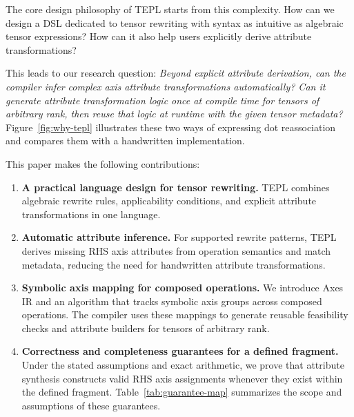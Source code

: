 The core design philosophy of TEPL starts from this complexity.
How can we design a DSL dedicated to tensor rewriting with syntax as
intuitive as algebraic tensor expressions? How can it also help users
explicitly derive attribute transformations?

This leads to our research question: \emph{Beyond explicit attribute
derivation, can the compiler infer complex axis attribute transformations
automatically? Can it generate attribute transformation logic once at
compile time for tensors of arbitrary rank, then reuse that logic at
runtime with the given tensor metadata?}
Figure~\ref{fig:why-tepl} illustrates these two ways of expressing dot
reassociation and compares them with a handwritten implementation.

This paper makes the following contributions:
\begingroup
\setlength{\leftmargini}{2em}
\makeatletter
\let\contributionlistdefaults\@listi
\def\@listi{\contributionlistdefaults
  \topsep2pt\relax
  \itemsep2pt\relax
  \parsep0pt\relax
  \partopsep0pt\relax}
\makeatother
\begin{enumerate}
\item \textbf{A practical language design for tensor rewriting.}
TEPL combines algebraic rewrite rules, applicability conditions, and
explicit attribute transformations in one language.
\item \textbf{Automatic attribute inference.}
For supported rewrite patterns, TEPL derives missing RHS axis attributes
from operation semantics and match metadata, reducing the need for
handwritten attribute transformations.
\item \textbf{Symbolic axis mapping for composed operations.}
We introduce Axes IR and an algorithm that tracks symbolic axis groups
across composed operations. The compiler uses these mappings to generate
reusable feasibility checks and attribute builders for tensors of
arbitrary rank.
\item \textbf{Correctness and completeness guarantees for a defined fragment.}
Under the stated assumptions and exact arithmetic, we prove that attribute
synthesis constructs valid RHS axis assignments whenever they exist
within the defined fragment. Table~\ref{tab:guarantee-map} summarizes the
scope and assumptions of these guarantees.
\end{enumerate}
\endgroup
